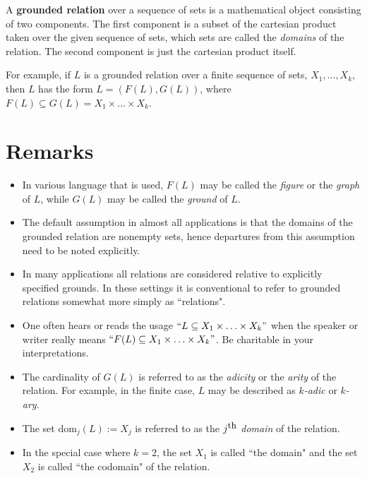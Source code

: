 \documentclass[12pt]{article}
\begin{document}
A \textbf{grounded relation} over a sequence of sets is a mathematical object consisting of two components.  The first component is a subset of the cartesian product taken over the given sequence of sets, which sets are called the \textit{domains} of the relation.  The second component is just the cartesian product itself.

For example, if $L$ is a grounded relation over a finite sequence of sets, $X_1, \ldots, X_k$, then $L$ has the form $L = (F(L), G(L))$, where $F(L) \subseteq G(L) = X_1 \times \ldots \times X_k$.

\section{Remarks}

\begin{itemize}
\item
In various language that is used, $F(L)$ may be called the \textit{figure} or the \textit{graph} of $L$, while $G(L)$ may be called the \textit{ground} of $L$.
\item
The default assumption in almost all applications is that the domains of the grounded relation are nonempty sets, hence departures from this assumption need to be noted explicitly.
\item
In many applications all relations are considered relative to explicitly specified grounds.  In these settings it is conventional to refer to grounded relations somewhat more simply as ``relations".
\item
One often hears or reads the usage $``L \subseteq X_1 \times \ldots \times X_k"$ when the speaker or writer really means $``F(L) \subseteq X_1 \times \ldots \times X_k"$.  Be charitable in your interpretations.
\item
The cardinality of $G(L)$ is referred to as the \textit{adicity} or the \textit{arity} of the relation.  For example, in the finite case, $L$ may be described as $k$\textit{-adic} or $k$\textit{-ary}.
\item
The set $\mathrm{dom}_j(L) := X_j$ is referred to as the $j^{\mbox{\small{th}}}$ \textit{domain} of the relation.
\item
In the special case where $k = 2$, the set $X_1$ is called ``the domain" and the set $X_2$ is called ``the codomain" of the relation.
\end{itemize}

\end{document}
